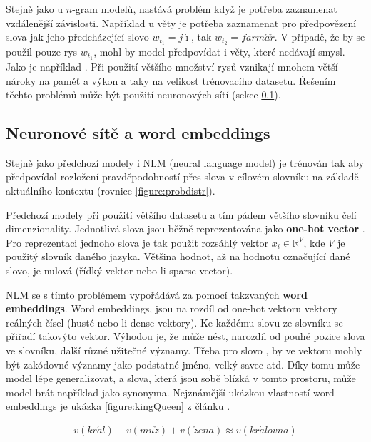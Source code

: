 Stejně jako u $n$-gram modelů, nastává problém když je potřeba zaznamenat vzdálenější závislosti. Například u věty  je potřeba zaznamenat pro předpovězení slova  jak jeho předcházející slovo $w_{t_1}=j\acute{\imath}$, tak $w_{t_2}=farm\acute{a}\check{r}$. V případě, že by se použil pouze rys $w_{t_1}$, mohl by model předpovídat i věty, které nedávají smysl. Jako je například . Při použití většího množství rysů vznikají mnohem větší nároky na paměť a výkon a taky na velikost trénovacího datasetu. Řešením těchto problémů může být použití neuronových sítí (sekce \ref{subsection:neuralembeddings}).


\subsection{Neuronové sítě a word embeddings}\label{subsection:neuralembeddings}
Stejně jako předchozí modely i NLM (neural language model) je trénován tak aby předpovídal rozložení pravděpodobností přes slova v cílovém slovníku na základě aktuálního kontextu (rovnice \ref{figure:probdistr}).

Předchozí modely při použití většího datasetu a tím pádem většího slovníku čelí  dimenzionality. Jednotlivá slova jsou běžně reprezentována jako \textbf{one-hot vector} . Pro reprezentaci jednoho slova je tak použit rozsáhlý vektor $x_i \in \mathbb{R}^{V}$, kde $V$ je použitý slovník daného jazyka. Většina hodnot, až na hodnotu označující dané slovo, je nulová (řídký vektor nebo-li sparse vector).

NLM se s tímto problémem vypořádává za pomocí takzvaných \textbf{word embeddings}. Word embeddings, jsou na rozdíl od one-hot vektoru vektory reálných čísel (husté nebo-li dense vektory). Ke každému slovu ze slovníku se přiřadí takovýto vektor. Výhodou je, že může nést, narozdíl od pouhé pozice slova ve slovníku, další různé užitečné významy. Třeba pro slovo , by ve vektoru mohly být zakódovné významy jako podstatné jméno, velký savec atd. Díky tomu může model lépe generalizovat, a slova, která jsou sobě blízká v tomto prostoru, může model brát například jako synonyma.
Nejznámější ukázkou vlastností word embeddings je ukázka \ref{figure:kingQueen} z článku \cite{kingQueen}.

\begin{align}\label{figure:kingQueen}
  v(kr\acute{a}l) - v(mu\check{z}) + v(\check{z}ena) \approx v(kr\acute{a}lovna)
\end{align}

